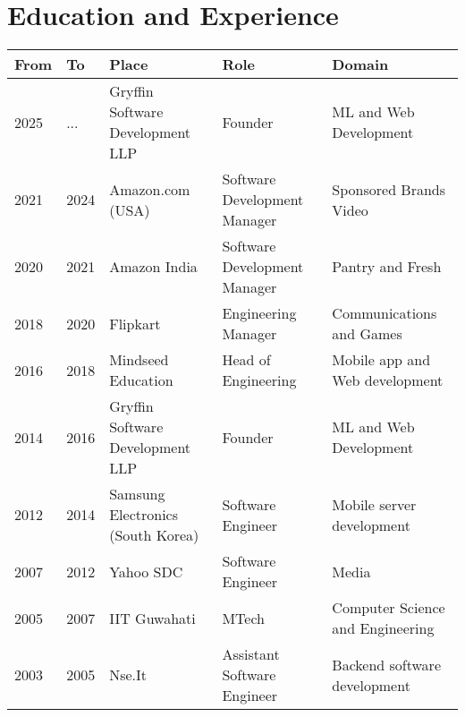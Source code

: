 \documentclass[11pt,a4paper,sans]{moderncv} %
\begin{document}
\section{Education and Experience}
\small
{
  \begin{tabular}{l|l|l|l|l}
    From & To & Place & Role & Domain \\
    \hline
    2025 & ... & Gryffin Software Development LLP & Founder & ML and Web Development \\
    2021 & 2024 & Amazon.com (USA) & Software Development Manager & Sponsored Brands Video \\
    2020 & 2021 & Amazon India & Software Development Manager & Pantry and Fresh \\
    2018 & 2020 & Flipkart & Engineering Manager & Communications and Games \\
    2016 & 2018 & Mindseed Education & Head of Engineering & Mobile app and Web development \\
    2014 & 2016 & Gryffin Software Development LLP & Founder & ML and Web Development \\
    2012 & 2014 & Samsung Electronics (South Korea) & Software Engineer & Mobile server development \\
    2007 & 2012 & Yahoo SDC & Software Engineer & Media \\
    2005 & 2007 & IIT Guwahati & MTech & Computer Science and Engineering \\
    2003 & 2005 & Nse.It & Assistant Software Engineer & Backend software development
  \end{tabular}
}
\end{document}
